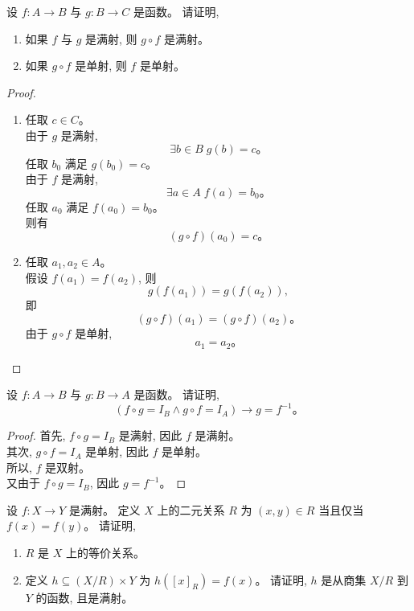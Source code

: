 \documentclass[a4paper, justified]{tufte-handout}
\begin{document}
\newpage
\begin{problem}[$g \circ f$]
  设 $f: A \to B$ 与 $g: B \to C$ 是函数。
  请证明,
  \begin{enumerate}[(1)]
    \item 如果 $f$ 与 $g$ 是满射, 则 $g \circ f$ 是满射。
    \item 如果 $g \circ f$ 是单射, 则 $f$ 是单射。
  \end{enumerate}
\end{problem}

\begin{proof}
  \begin{enumerate}[(1)]
    \item 任取 $c \in C$。\\
      由于 $g$ 是满射,
      \[
        \exists b \in B\; g(b) = c\text{。}
      \]
      任取 $b_{0}$ 满足 $g(b_{0}) = c$。\\
      由于 $f$ 是满射,
      \[
        \exists a \in A\; f(a) = b_{0}\text{。}
      \]
      任取 $a_{0}$ 满足 $f(a_{0}) = b_{0}$。\\
      则有
      \[
        (g \circ f)(a_{0}) = c\text{。}
      \]
    \item 任取 $a_{1}, a_{2} \in A$。\\
      假设 $f(a_{1}) = f(a_{2})$, 则
      \[
        g(f(a_{1})) = g(f(a_{2})),
      \]
      即
      \[
        (g \circ f)(a_{1}) = (g \circ f)(a_{2})\text{。}
      \]
      由于 $g \circ f$ 是单射,
      \[
        a_{1} = a_{2}\text{。}
      \]
  \end{enumerate}
\end{proof}

\newpage
\begin{problem}[反函数]
  设 $f: A \to B$ 与 $g: B \to A$ 是函数。
  请证明,
  \[
    (f \circ g = I_B \land g \circ f = I_A) \to g = f^{-1}\text{。}
  \]
\end{problem}

\begin{proof}
  首先, $f \circ g = I_{B}$ 是满射, 因此 $f$ 是满射。\\
  其次, $g \circ f = I_{A}$ 是单射, 因此 $f$ 是单射。\\
  所以, $f$ 是双射。\\
  又由于 $f \circ g = I_{B}$, 因此 $g = f^{-1}$。
\end{proof}

\newpage
\begin{problem}[函数与等价关系]
  设 $f: X \to Y$ 是满射。
  定义 $X$ 上的二元关系 $R$ 为 $(x, y) \in R$ 当且仅当 $f(x) = f(y)$。
  请证明,
  \begin{enumerate}[(1)]
    \item $R$ 是 $X$ 上的等价关系。
    \item 定义 $h \subseteq (X/R) \times Y$ 为 $h([x]_{R}) = f(x)$。
      请证明, $h$ 是从商集 $X/R$ 到 $Y$ 的函数, 且是满射。
  \end{enumerate}
\end{problem}
\end{document}
